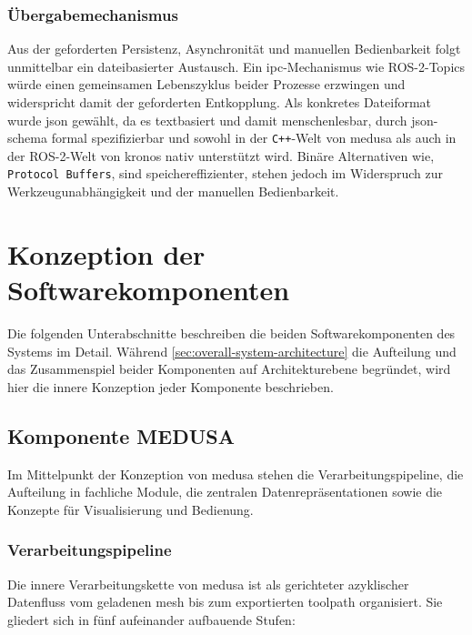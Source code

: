            \subsubsection{Übergabemechanismus}\label{subsubsec:interface-handover-mechanism}
                Aus der geforderten Persistenz, Asynchronität und manuellen Bedienbarkeit folgt unmittelbar ein dateibasierter Austausch.
                Ein \gls{ipc}-Mechanismus wie ROS-2-Topics würde einen gemeinsamen Lebenszyklus beider Prozesse erzwingen und widerspricht damit der geforderten Entkopplung.
                Als konkretes Dateiformat wurde \gls{json} gewählt, da es textbasiert und damit menschenlesbar, durch \gls{json-schema} formal spezifizierbar und sowohl in der \texttt{C++}-Welt von \ac{medusa} als auch in der ROS-2-Welt von \ac{kronos} nativ unterstützt wird.
                Binäre Alternativen wie, \texttt{Protocol Buffers}, sind speichereffizienter, stehen jedoch im Widerspruch zur Werkzeugunabhängigkeit und der manuellen Bedienbarkeit.

    \section{Konzeption der Softwarekomponenten}\label{sec:concept-of-software-components}
        Die folgenden Unterabschnitte beschreiben die beiden Softwarekomponenten des Systems im Detail.
        Während \cref{sec:overall-system-architecture} die Aufteilung und das Zusammenspiel beider Komponenten auf Architekturebene begründet, wird hier die innere Konzeption jeder Komponente beschrieben.

        \subsection{Komponente MEDUSA}\label{subsec:component-medusa}
            Im Mittelpunkt der Konzeption von \ac{medusa} stehen die Verarbeitungspipeline, die Aufteilung in fachliche Module, die zentralen Datenrepräsentationen sowie die Konzepte für Visualisierung und Bedienung.

            \subsubsection{Verarbeitungspipeline}\label{subsubsec:concept-medusa-pipeline} 
                Die innere Verarbeitungskette von \ac{medusa} ist als gerichteter azyklischer Datenfluss vom geladenen \gls{mesh} bis zum exportierten \gls{toolpath} organisiert.
                Sie gliedert sich in fünf aufeinander aufbauende Stufen:

